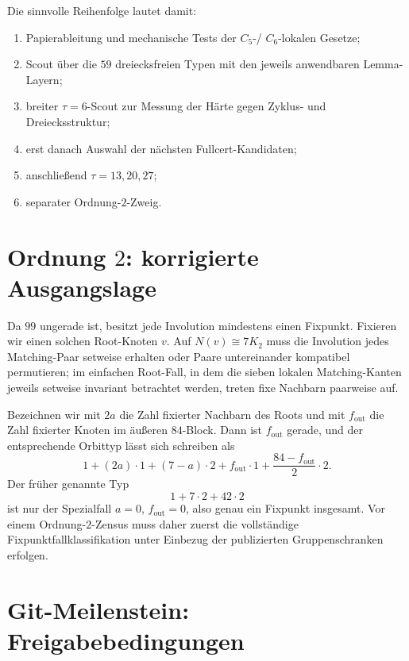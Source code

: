 \documentclass[11pt,a4paper]{article}
\begin{document}
Die sinnvolle Reihenfolge lautet damit:
\begin{enumerate}[nosep]
\item Papierableitung und mechanische Tests der $C_5$-/ $C_6$-lokalen Gesetze;
\item Scout über die $59$ dreiecksfreien Typen mit den jeweils anwendbaren Lemma-Layern;
\item breiter $\tau=6$-Scout zur Messung der Härte gegen Zyklus- und Dreiecksstruktur;
\item erst danach Auswahl der nächsten Fullcert-Kandidaten;
\item anschließend $\tau=13,20,27$;
\item separater Ordnung-$2$-Zweig.
\end{enumerate}

\section{Ordnung $2$: korrigierte Ausgangslage}

Da $99$ ungerade ist, besitzt jede Involution mindestens einen Fixpunkt. Fixieren wir einen solchen Root-Knoten $v$. Auf $N(v)\cong7K_2$ muss die Involution jedes Matching-Paar setweise erhalten oder Paare untereinander kompatibel permutieren; im einfachen Root-Fall, in dem die sieben lokalen Matching-Kanten jeweils setweise invariant betrachtet werden, treten fixe Nachbarn paarweise auf.

Bezeichnen wir mit $2a$ die Zahl fixierter Nachbarn des Roots und mit $f_{\mathrm{out}}$ die Zahl fixierter Knoten im äußeren $84$-Block. Dann ist $f_{\mathrm{out}}$ gerade, und der entsprechende Orbittyp lässt sich schreiben als
\[
1
+(2a)\cdot1
+(7-a)\cdot2
+f_{\mathrm{out}}\cdot1
+\frac{84-f_{\mathrm{out}}}{2}\cdot2.
\]
Der früher genannte Typ
\[
1+7\cdot2+42\cdot2
\]
ist nur der Spezialfall $a=0$, $f_{\mathrm{out}}=0$, also genau ein Fixpunkt insgesamt. Vor einem Ordnung-$2$-Zensus muss daher zuerst die vollständige Fixpunktfallklassifikation unter Einbezug der publizierten Gruppenschranken erfolgen.

\section{Git-Meilenstein: Freigabebedingungen}
\end{document}
